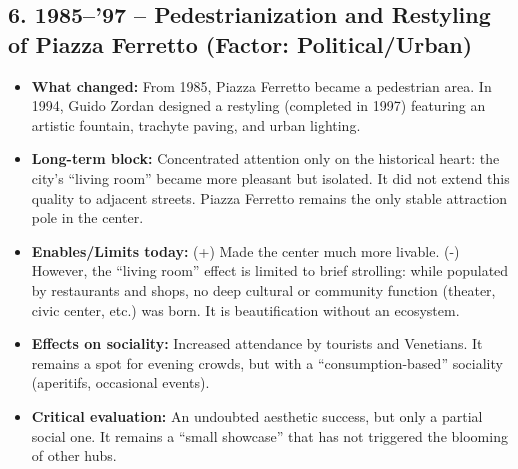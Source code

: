 \documentclass[a4paper,11pt]{article}
\begin{document}
\subsection*{6. 1985--'97 – Pedestrianization and Restyling of Piazza Ferretto (Factor: Political/Urban)}
\begin{itemize}
    \item \textbf{What changed:} From 1985, Piazza Ferretto became a pedestrian area. In 1994, Guido Zordan designed a restyling (completed in 1997) featuring an artistic fountain, trachyte paving, and urban lighting.
    \item \textbf{Long-term block:} Concentrated attention only on the historical heart: the city's ``living room'' became more pleasant but isolated. It did not extend this quality to adjacent streets. Piazza Ferretto remains the only stable attraction pole in the center.
    \item \textbf{Enables/Limits today:} (+) Made the center much more livable. (-) However, the ``living room'' effect is limited to brief strolling: while populated by restaurants and shops, no deep cultural or community function (theater, civic center, etc.) was born. It is beautification without an ecosystem.
    \item \textbf{Effects on sociality:} Increased attendance by tourists and Venetians. It remains a spot for evening crowds, but with a ``consumption-based'' sociality (aperitifs, occasional events).
    \item \textbf{Critical evaluation:} An undoubted aesthetic success, but only a partial social one. It remains a ``small showcase'' that has not triggered the blooming of other hubs.
\end{itemize}
\end{document}
